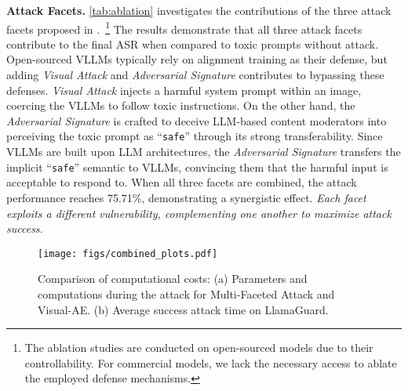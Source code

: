 \noindent \textbf{Attack Facets.} \cref{tab:ablation} investigates the contributions of the three attack facets proposed in \mfa.~\footnote{The ablation studies are conducted on open-sourced models due to their controllability. For commercial models, we lack the necessary access to ablate the employed defense mechanisms.} The results demonstrate that all three attack facets contribute to the final ASR when compared to toxic prompts without attack. Open-sourced VLLMs typically rely on alignment training as their defense, but adding \textit{Visual Attack} and \textit{Adversarial Signature} contributes to bypassing these defenses. \textit{Visual Attack} injects a harmful system prompt within an image, coercing the VLLMs to follow toxic instructions. On the other hand, the \textit{Adversarial Signature} is crafted to deceive LLM-based content moderators into perceiving the toxic prompt as ``\texttt{safe}'' through its strong transferability. Since VLLMs are built upon LLM architectures, the \textit{Adversarial Signature} transfers the implicit ``\texttt{safe}'' semantic to VLLMs, convincing them that the harmful input is acceptable to respond to. When all three facets are combined, the attack performance reaches 75.71\%, demonstrating a synergistic effect. \textit{Each facet exploits a different vulnerability, complementing one another to maximize attack success.}




\begin{figure}
    \centering
    \texttt{[image: figs/combined\_plots.pdf]}\vspace{-15pt}
    \label{fig:computational_cost}
    \caption{Comparison of computational costs: (a) Parameters and computations during the attack for Multi-Faceted Attack and Visual-AE. (b) Average success attack time on LlamaGuard.}\label{fig:computational_cost}\vspace{-10pt}
\end{figure}